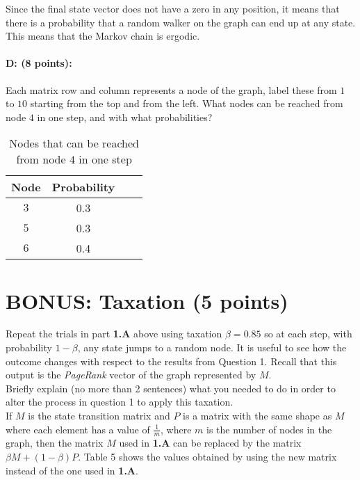 \documentclass[11pt]{article}
\begin{document}
Since the final state vector does not have a zero in any position, it means that there is a probability that a random walker on the graph can end up at any state. This means that the Markov chain is ergodic.

\paragraph{D: (8 points):} 
Each matrix row and column represents a node of the graph, label these from $1$ to $10$ starting from the top and from the left. What nodes can be reached from node $4$ in one step, and with what probabilities?


    \begin{table}[!h] 
    \centering
    \label{6E}
    \caption{Nodes that can be reached from node $4$ in one step}
    \begin{tabular}{|c|c|c|c|}
      \hline
    Node & Probability \\
      \hline        
    $3$ & 0.3\\
      \hline
    $5$ & 0.3\\
      \hline
    $6$ & 0.4\\
      \hline
    \end{tabular}
\end{table}

\section{BONUS: Taxation (5 points)}
Repeat the trials in part \textbf{1.A} above using taxation $\beta = 0.85$ so at each step, with probability $1 - \beta$, any state jumps to a random node. It is useful to see how the outcome changes with respect to the results from Question 1. Recall that this output is the \textit{PageRank} vector of the graph represented by $M$.\\
Briefly explain (no more than 2 sentences) what you needed to do in order to alter the process in question 1 to apply this taxation.\\

If $M$ is the state transition matrix and $P$ is a matrix with the same shape as $M$ where each element has a value of $\frac{1}{m}$, where $m$ is the number of nodes in the graph, then the matrix $M$ used in \textbf{1.A} can be replaced by the matrix $\beta M + (1-\beta)P$. Table 5 shows the values obtained by using the new matrix instead of the one used in \textbf{1.A}.\\
\end{document}
